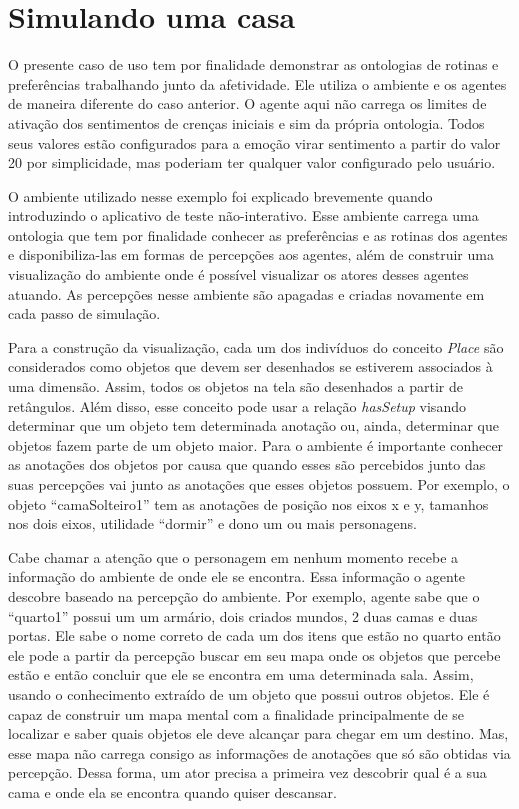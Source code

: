 \section{Simulando uma casa} \label{ch:cdu:home}

O presente caso de uso tem por finalidade demonstrar as ontologias de rotinas
e preferências trabalhando junto da afetividade. Ele utiliza o ambiente e os
agentes de maneira diferente do caso anterior. O agente aqui não carrega os
limites de ativação dos sentimentos de crenças iniciais e sim da própria
ontologia. Todos seus valores estão configurados para a emoção virar
sentimento a partir do valor 20\label{mark:emo} por simplicidade, mas poderiam ter qualquer
valor configurado pelo usuário.

O ambiente utilizado nesse exemplo foi explicado brevemente quando introduzindo o
aplicativo de teste não-interativo. Esse ambiente carrega uma ontologia que
tem por finalidade conhecer as preferências e as rotinas dos agentes e
disponibiliza-las em formas de percepções aos agentes, além de
construir uma visualização do ambiente onde é possível visualizar os atores
desses agentes atuando. As percepções nesse ambiente são apagadas e criadas
novamente em cada passo de simulação.

Para a construção da visualização, cada um dos indivíduos do conceito
\emph{Place} são considerados como objetos que devem ser desenhados se
estiverem associados à uma dimensão. Assim, todos os objetos na tela são
desenhados a partir de retângulos. Além disso, esse conceito pode usar a
relação \emph{hasSetup} visando determinar que um objeto tem determinada
anotação ou, ainda, determinar que objetos fazem parte de um objeto maior.
Para o ambiente é importante conhecer as anotações dos objetos por causa que
quando esses são percebidos junto das suas percepções vai junto as anotações
que esses objetos possuem. Por exemplo, o objeto ``camaSolteiro1'' tem as
anotações de posição nos eixos x e y, tamanhos nos dois eixos, utilidade
``dormir'' e dono um ou mais personagens.

Cabe chamar a atenção que o personagem em nenhum momento recebe a informação
do ambiente de onde ele se encontra. Essa informação o agente descobre baseado
na percepção do ambiente. Por exemplo, agente sabe que o ``quarto1'' possui um
um armário, dois criados mundos, 2 duas camas e duas portas. Ele sabe o nome
correto de cada um dos itens que estão no quarto então ele pode a partir da
percepção buscar em seu mapa onde os objetos que percebe estão e então
concluir que ele se encontra em uma determinada sala. Assim, usando o
conhecimento extraído de um objeto que possui outros objetos. Ele é capaz de
construir um mapa mental com a finalidade principalmente de se localizar e
saber quais objetos ele deve alcançar para chegar em um destino. Mas, esse
mapa não carrega consigo as informações de anotações que só são obtidas via
percepção. Dessa forma, um ator precisa a primeira vez descobrir qual é a sua
cama e onde ela se encontra quando quiser descansar.

